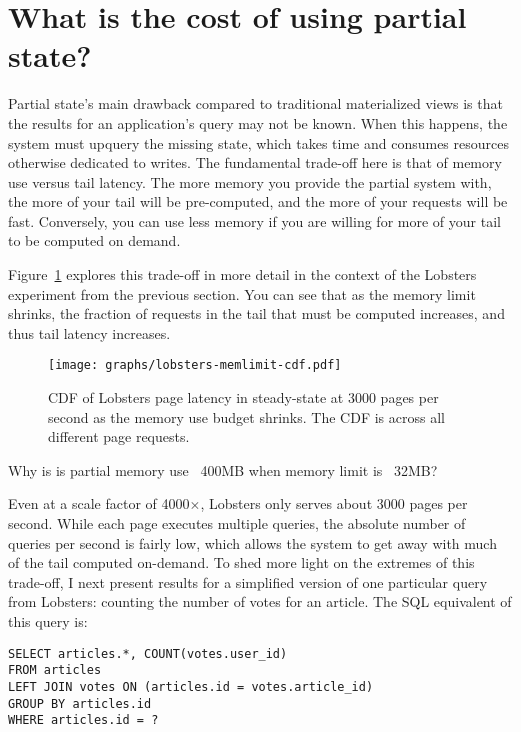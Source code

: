\section{What is the cost of using partial state?}
\label{s:eval:cost}

Partial state's main drawback compared to traditional materialized views is
that the results for an application's query may not be known. When this happens,
the system must upquery the missing state, which takes time and consumes
resources otherwise dedicated to writes. The fundamental trade-off here is that
of memory use versus tail latency. The more memory you provide the partial
system with, the more of your tail will be pre-computed, and the more of your
requests will be fast. Conversely, you can use less memory if you are willing
for more of your tail to be computed on demand.

Figure~\ref{f:lobsters-mem-latency} explores this trade-off in more detail in
the context of the Lobsters experiment from the previous section. You can see
that as the memory limit shrinks, the fraction of requests in the tail that must
be computed increases, and thus tail latency increases.

\begin{figure}[h]
  \centering
  \texttt{[image: graphs/lobsters-memlimit-cdf.pdf]}
  \caption{CDF of Lobsters page latency in steady-state at 3000 pages per second
  as the memory use budget shrinks. The CDF is across all different page
  requests.}
  \label{f:lobsters-mem-latency}
\end{figure}

\begin{inprogress}
Why is is partial memory use ~400MB when memory limit is ~32MB?
\end{inprogress}

Even at a scale factor of 4000$\times$, Lobsters only serves about 3000 pages
per second. While each page executes multiple queries, the absolute number of
queries per second is fairly low, which allows the system to get away with much
of the tail computed on-demand. To shed more light on the extremes of this
trade-off, I next present results for a simplified version of one particular
query from Lobsters: counting the number of votes for an article. The SQL
equivalent of this query is:

\begin{verbatim}
SELECT articles.*, COUNT(votes.user_id)
FROM articles
LEFT JOIN votes ON (articles.id = votes.article_id)
GROUP BY articles.id
WHERE articles.id = ?
\end{verbatim}


